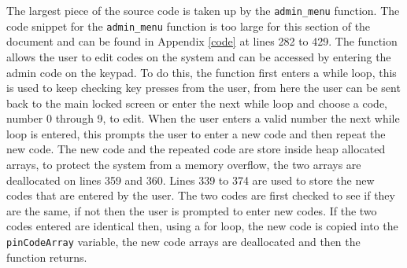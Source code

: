   The largest piece of the source code is taken up by the \verb|admin_menu| function.
  The code snippet for the \verb|admin_menu| function is too large for this section of the document and can be found in Appendix \ref{code} at lines 282 to 429.
  The function allows the user to edit codes on the system and can be accessed by entering the admin code on the keypad.
  To do this, the function first enters a while loop, this is used to keep checking key presses from the user, from here the user can be sent back to the main locked screen or enter the next while loop and choose a code, number 0 through 9, to edit.
  When the user enters a valid number the next while loop is entered, this prompts the user to enter a new code and then repeat the new code.
  The new code and the repeated code are store inside heap allocated arrays, to protect the system from a memory overflow, the two arrays are deallocated on lines 359 and 360.
  Lines 339 to 374 are used to store the new codes that are entered by the user.
  The two codes are first checked to see if they are the same, if not then the user is prompted to enter new codes.
  If the two codes entered are identical then, using a for loop, the new code is copied into the \verb|pinCodeArray| variable, the new code arrays are deallocated and then the function returns.

